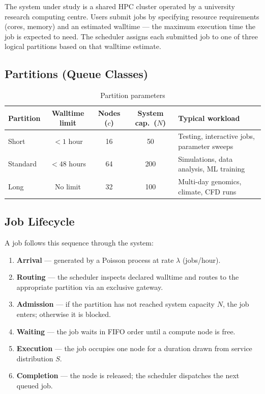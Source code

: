 \documentclass[11pt,a4paper]{article}
\newcommand{\lam}{\ensuremath{\lambda}}
\begin{document}
The system under study is a shared HPC cluster operated by a university research computing centre.
Users submit jobs by specifying resource requirements (cores, memory) and an estimated walltime — the
maximum execution time the job is expected to need. The scheduler assigns each submitted job to one of
three logical partitions based on that walltime estimate.

\subsection{Partitions (Queue Classes)}

\begin{table}[H]
\centering
\caption{Partition parameters}
\begin{tabularx}{\linewidth}{lcccX}
\toprule
\textbf{Partition} & \textbf{Walltime limit} & \textbf{Nodes ($c$)} & \textbf{System cap.\ ($N$)} & \textbf{Typical workload} \\
\midrule
Short    & $< 1$ hour  & 16 & 50  & Testing, interactive jobs, parameter sweeps \\
Standard & $< 48$ hours & 64 & 200 & Simulations, data analysis, ML training \\
Long     & No limit    & 32 & 100 & Multi-day genomics, climate, CFD runs \\
\bottomrule
\end{tabularx}
\end{table}

\subsection{Job Lifecycle}

A job follows this sequence through the system:

\begin{enumerate}
  \item \textbf{Arrival} — generated by a Poisson process at rate $\lam$ (jobs/hour).
  \item \textbf{Routing} — the scheduler inspects declared walltime and routes to the appropriate partition via an exclusive gateway.
  \item \textbf{Admission} — if the partition has not reached system capacity $N$, the job enters; otherwise it is blocked.
  \item \textbf{Waiting} — the job waits in FIFO order until a compute node is free.
  \item \textbf{Execution} — the job occupies one node for a duration drawn from service distribution $S$.
  \item \textbf{Completion} — the node is released; the scheduler dispatches the next queued job.
\end{enumerate}
\end{document}
